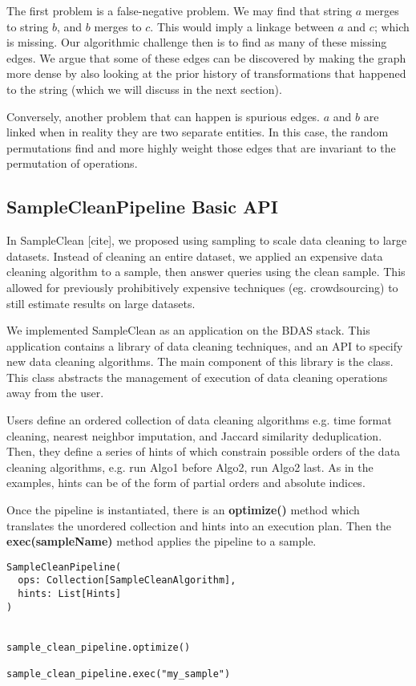 The first problem is a false-negative problem.
We may find that string $a$ merges to string $b$, and $b$ merges to $c$. 
This would imply a linkage between $a$ and $c$; which is missing.
Our algorithmic challenge then is to find as many of these missing edges.
We argue that some of these edges can be discovered by making the graph more dense 
by also looking at the prior history of transformations that happened to the string (which we will discuss in the next section).

Conversely, another problem that can happen is spurious edges.
$a$ and $b$ are linked when in reality they are two separate entities.
In this case, the random permutations find and more highly weight those edges that are invariant to the permutation of operations.

\subsection{SampleCleanPipeline Basic API}
In SampleClean [cite], we proposed using sampling to scale data cleaning to large datasets.
Instead of cleaning an entire dataset, we applied an expensive data cleaning algorithm to a sample, then 
answer queries using the clean sample.
This allowed for previously prohibitively expensive techniques (eg. crowdsourcing) to still estimate results
on large datasets.

We implemented SampleClean as an application on the BDAS stack.
This application contains a library of data cleaning techniques, and an API to specify new data cleaning algorithms.
The main component of this library is the \scp class.
This class abstracts the management of execution of data cleaning operations away from the user.

Users define an ordered collection of data cleaning algorithms e.g. time format cleaning, nearest neighbor imputation, and Jaccard similarity deduplication.
Then, they define a series of hints of which constrain possible orders
of the data cleaning algorithms, e.g. run Algo1 before Algo2, run Algo2 last.
As in the examples, hints can be of the form of partial orders and absolute indices.

Once the pipeline is instantiated, there is an \textbf{optimize()} method which
translates the unordered collection and hints into an execution plan.
Then the \textbf{exec(sampleName)} method applies the pipeline to a sample.

\begin{lstlisting}
SampleCleanPipeline( 
  ops: Collection[SampleCleanAlgorithm],
  hints: List[Hints] 
) 


sample_clean_pipeline.optimize()

sample_clean_pipeline.exec("my_sample")
\end{lstlisting}


